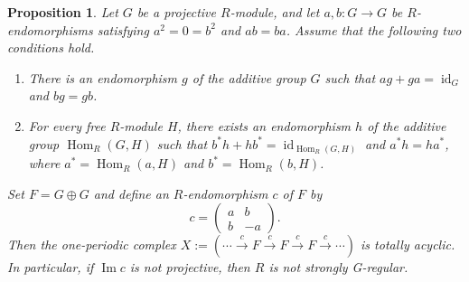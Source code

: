 \documentclass{amsart}
\newtheorem{prop}[thm]{Proposition}
\theoremstyle{definition}
\theoremstyle{remark}
\numberwithin{equation}{thm}
\def\Hom{\operatorname{Hom}}
\def\id{\operatorname{id}}
\def\Im{\operatorname{Im}}
\begin{document}
\begin{prop}\label{twosqzeromaps}
Let $G$ be a projective $R$-module, and let $a,b:G\to G$ be $R$-endomorphisms satisfying $a^2=0=b^2$ and $ab=ba$. Assume that the following two conditions hold.
\begin{enumerate}[{\rm (1)}]
\item There is an endomorphism $g$ of the additive group $G$ such that $ag+ga=\id_G$ and $bg=gb$.
\item For every free $R$-module $H$, there exists an endomorphism $h$ of the additive group $\Hom_R(G,H)$ such that $b^*h+hb^*=\id_{\Hom_R(G,H)}$ and $a^*h=ha^*$, where $a^*=\Hom_R(a,H)$ and $b^*=\Hom_R(b,H)$.
\end{enumerate}
Set $F=G\oplus G$ and define an $R$-endomorphism $c$ of $F$ by
$$
c=
\begin{pmatrix}
a&b\\
b&-a
\end{pmatrix}.
$$
Then the one-periodic complex $X:=(\cdots\xrightarrow{c}F\xrightarrow{c}F\xrightarrow{c}F\xrightarrow{c}\cdots)$ is totally acyclic. In particular, if $\Im c$ is not projective, then $R$ is not strongly G-regular.
\end{prop}
\end{document}
